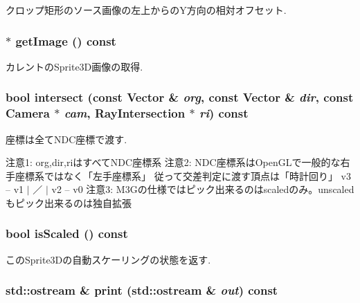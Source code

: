 クロップ矩形のソース画像の左上からのY方向の相対オフセット. \hypertarget{classm3g_1_1Sprite3D_a8c0193b0e7d47d4b5c9f60df24c44f5}{
\subsubsection[{getImage}]{ $\ast$ getImage () const}}
\label{classm3g_1_1Sprite3D_a8c0193b0e7d47d4b5c9f60df24c44f5}


カレントのSprite3D画像の取得. \hypertarget{classm3g_1_1Sprite3D_b6ca418b9c39fed3206e02aed801ee3b}{
\subsubsection[{intersect}]{\setlength{\rightskip}{0pt plus 5cm}bool intersect (const {\bf Vector} \& {\em org}, \/  const {\bf Vector} \& {\em dir}, \/  const {\bf Camera} $\ast$ {\em cam}, \/  {\bf RayIntersection} $\ast$ {\em ri}) const}}
\label{classm3g_1_1Sprite3D_b6ca418b9c39fed3206e02aed801ee3b}


座標は全てNDC座標で渡す.

注意1: org,dir,riはすべてNDC座標系 注意2: NDC座標系はOpenGLで一般的な右手座標系ではなく「左手座標系」 従って交差判定に渡す頂点は「時計回り」 v3 -- v1 $|$ ／ $|$ v2 -- v0 注意3: M3Gの仕様ではピック出来るのはscaledのみ。unscaledもピック出来るのは独自拡張 \hypertarget{classm3g_1_1Sprite3D_8e3e7fa70e1d3f2342580991105779f5}{
\subsubsection[{isScaled}]{\setlength{\rightskip}{0pt plus 5cm}bool isScaled () const}}
\label{classm3g_1_1Sprite3D_8e3e7fa70e1d3f2342580991105779f5}


このSprite3Dの自動スケーリングの状態を返す. \hypertarget{classm3g_1_1Sprite3D_6fea17fa1532df3794f8cb39cb4f911f}{
\subsubsection[{print}]{\setlength{\rightskip}{0pt plus 5cm}std::ostream \& print (std::ostream \& {\em out}) const}}
\label{classm3g_1_1Sprite3D_6fea17fa1532df3794f8cb39cb4f911f}


